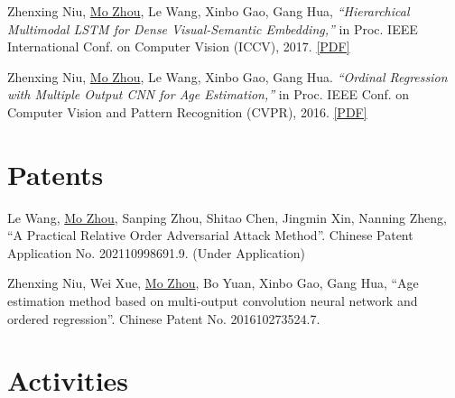 \documentclass[10pt,margin,line,pifont,palatino,courier]{res}
\begin{document}
\begin{resume}
\begin{enumerate}[noitemsep, leftmargin=*, label={[C0{\arabic*}]}]
\item Zhenxing Niu, \underline{Mo Zhou}, Le Wang, Xinbo Gao, Gang Hua,
\textit{``Hierarchical Multimodal LSTM for Dense Visual-Semantic Embedding,''}
in Proc. IEEE International Conf. on Computer Vision (ICCV), 2017.
\href{https://openaccess.thecvf.com/content_iccv_2017/html/Niu_Hierarchical_Multimodal_LSTM_ICCV_2017_paper.html}{[PDF]}

\item Zhenxing Niu, \underline{Mo Zhou}, Le Wang, Xinbo Gao, Gang Hua.
\textit{``Ordinal Regression with Multiple Output CNN for Age Estimation,''}
in Proc. IEEE Conf. on Computer Vision and Pattern Recognition (CVPR), 2016.
\href{https://openaccess.thecvf.com/content_cvpr_2016/html/Niu_Ordinal_Regression_With_CVPR_2016_paper.html}{[PDF]}

\end{enumerate}

\section{\sc Patents}

\begin{enumerate}[noitemsep, leftmargin=*, label={[P0{\arabic*}]}]

\item Le Wang, \underline{Mo Zhou}, Sanping Zhou, Shitao Chen, Jingmin Xin, Nanning Zheng,
	``A Practical Relative Order Adversarial Attack Method''.
	Chinese Patent Application No. 202110998691.9. (Under Application)

\item Zhenxing Niu, Wei Xue, \underline{Mo Zhou}, Bo Yuan, Xinbo Gao, Gang Hua,
	``Age estimation method based on multi-output convolution neural
	network and ordered regression''. Chinese Patent No. 201610273524.7.

\end{enumerate}

\section{\sc Activities}


\end{resume}
\end{document}
